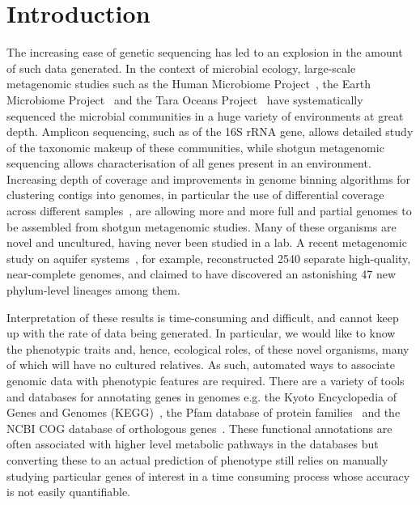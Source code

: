 \documentclass[10pt,letterpaper]{article}
\begin{document}
\section*{Introduction}
The increasing ease of genetic sequencing has led to an explosion in the amount of such data generated. In the context of microbial ecology, large-scale metagenomic studies such as the Human Microbiome Project~\cite{Huttenhower2012}, the Earth Microbiome Project~\cite{Gilbert2014} and the Tara Oceans Project~\cite{Zhang2015} have systematically sequenced the microbial communities in a huge variety of environments at great depth. Amplicon sequencing, such as of the 16S rRNA gene, allows detailed study of the taxonomic makeup of these communities, while shotgun metagenomic sequencing allows characterisation of all genes present in an environment. Increasing depth of coverage and improvements in genome binning algorithms for clustering contigs into genomes, in particular the use of differential coverage across different samples~\cite{Alneberg2014, Eren2015}, are allowing more and more full and partial genomes to be assembled from shotgun metagenomic studies. Many of these organisms are novel and uncultured, having never been studied in a lab. A recent metagenomic study on aquifer systems~\cite{Anantharaman2016}, for example, reconstructed 2540 separate high-quality, near-complete genomes, and claimed to have discovered an astonishing 47 new phylum-level lineages among them.

Interpretation of these results is time-consuming and difficult, and cannot keep up with the rate of data being generated. In particular, we would like to know the phenotypic traits and, hence, ecological roles, of these novel organisms, many of which will have no cultured relatives. As such, automated ways to associate genomic data with phenotypic features are required. There are a variety of tools and databases for annotating genes in genomes e.g. the Kyoto Encyclopedia of Genes and Genomes (KEGG)~\cite{Kanehisa2017}, the Pfam database of protein families~\cite{Finn2016} and the NCBI COG database of orthologous genes~\cite{Tatusov1997}. These functional annotations are often associated with higher level metabolic pathways in the databases but converting these to an actual prediction of 
phenotype still relies on manually studying particular genes of interest in a time consuming process whose accuracy is not easily quantifiable.

\end{document}
